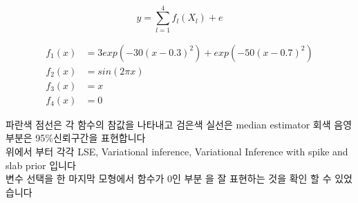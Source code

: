 \documentclass[11pt]{article}
\begin{document}
    \begin{center}
    \end{center}
    { \hspace*{\fill} \\}
    
    \[y = \sum_{l=1}^{4} f_l(X_l) + e \]

\[
\begin{align*}
f_1(x) &= 3exp(-30(x-0.3)^2)+exp(-50(x-0.7)^2)\\
f_2(x) &= sin(2\pi x)\\
f_3(x) &= x\\
f_4(x) &= 0
\end{align*}
\]

    파란색 점선은 각 함수의 참값을 나타내고 검은색 실선은 median estimator
회색 음영부분은 95\%신뢰구간을 표현합니다\\
위에서 부터 각각 LSE, Variational inference, Variational Inference with
spike and slab prior 입니다\\
변수 선택을 한 마지막 모형에서 함수가 0인 부분 을 잘 표현하는 것을 확인
할 수 있었습니다


    
    
    
    
\end{document}
